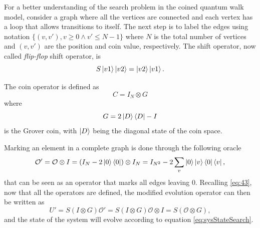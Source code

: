 \documentclass[../../dissertation.tex]{subfiles}
\begin{document}
For a better understanding of the search problem in the coined quantum walk
model, consider a graph where all the vertices are connected and each vertex
has a loop that allows transitions to itself.  The next step is to label the
edges using notation $\{(v,v'), v \geqslant 0 \land v' \leqslant N-1\}$ where
$N$ is the total number of vertices and $(v,v')$ are the position and coin
value, respectively.  The shift operator, now called \textit{flip-flop} shift
operator, is
\begin{equation}
	S\ket{v1}\ket{v2} = \ket{v2}\ket{v1}.
	\label{eq:chap3FlipFlop}
\end{equation}\par
The coin operator is defined as
\begin{equation}
	C = I_N \otimes G
\end{equation}
where 
\begin{equation}
	G = 2\ket{D}\bra{D} - I
\end{equation}
is the Grover coin, with $\ket{D}$ being the diagonal state of the coin space.\par

Marking an element in a complete graph is done through the following oracle
\begin{equation}
	\mathcal{O'} =\mathcal{O}\otimes I = (I_N - 2\ket{0}\bra{0})\otimes I_N = I_{N^2} - 2 \sum_v \ket{0}\ket{v}\bra{0}\bra{v} ,
\end{equation}
that can be seen as an operator that marks all edges leaving $0$. Recalling
\ref{eq:43}, now that all the operators are defined, the modified evolution
operator can then be written as
\begin{equation}
	U' = S(I \otimes G)\mathcal{O'} = S(I \otimes G)\mathcal{O} \otimes I = S (\mathcal{O} \otimes G),\label{eq:modifiedEvoCoined}
\end{equation}
and the state of the system will evolve according to equation
\ref{eq:sysStateSearch}.\par 
\end{document}
